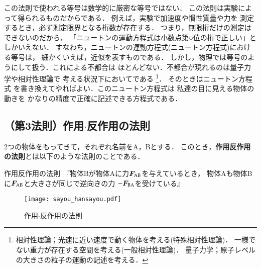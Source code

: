                 この法則で使われる等号は数学的に厳密な等号ではない．
                この法則は実験によって得られるものだからである．
                例えば，実験で加速度や慣性質量や力を
                測定するとき，必ず測定限界となる桁数が存在する．
                つまり，無限桁だけの測定はできないのだから，
                「ニュートンの運動方程式は小数点第○位の桁で正しい」としかいえない．
                すなわち，ニュートンの運動方程式(ニュートン方程式)における等号は，
                細かくいえば，近似を表すものである．
                しかし，物理では等号のようにして扱う．これによる不都合は
                ほとんどない．不都合が現れるのは量子力学や相対性理論で
                考える状況下においてである
                    \footnote{
                        相対性理論；光速に近い速度で動く物体を考える(特殊相対性理論)．
                        一様でない重力が存在する空間を考える(一般相対性理論)．
                        量子力学；原子レベルの大きさの粒子の運動の記述を考える．
                    }．
                そのときはニュートン方程式
                を書き換えてやればよい．このニュートン方程式は
                私達の目に見える物体の動きを
                かなりの精度で正確に記述できる方程式である．

        \subsection{（第3法則）作用$\cdot$反作用の法則}
            2つの物体をもってきて，それぞれ名前をA，Bとする．
            このとき，\textbf{作用反作用の法則}とは以下のような法則のことである．
                \begin{myshadebox}{作用反作用の法則}
                    『物体Bが物体Aに力$\boldsymbol{F}_{\rm{AB}}$を与えているとき，
                    物体Aも物体Bに$\boldsymbol{F}_{\rm{AB}}$と大きさが同じで逆向きの力
                    $-\boldsymbol{F}_{\rm{BA}}$を受けている』
                \end{myshadebox}
            \begin{figure}[hbt]
                \begin{center}
                    \texttt{[image: sayou\_hansayou.pdf]}
                    \caption{作用$\cdot$反作用の法則}
                    \label{fig:sayou_hansayou}
                \end{center}
            \end{figure}

